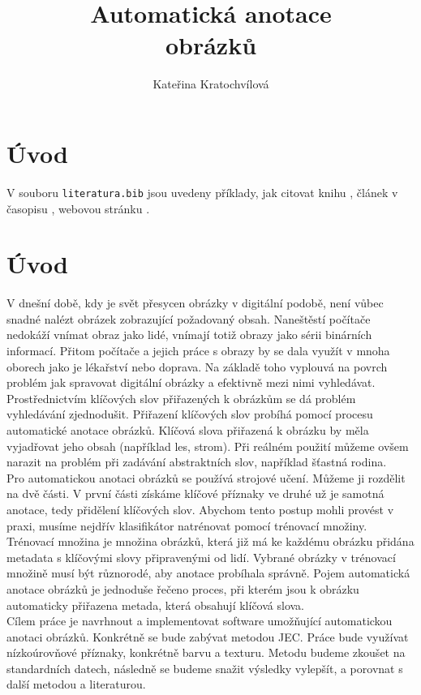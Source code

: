 \documentclass[czech,BP]{thesiskiv}
\author{Kateřina Kratochvílová}
\title{Automatická anotace\\obrázků}
\begin{document}
%
\maketitle
\tableofcontents

\chapter{Úvod}
V souboru \texttt{literatura.bib} jsou uvedeny příklady, jak citovat knihu \cite{KnuthAOCP2}, článek v časopisu \cite{Hoare1961}, webovou stránku \cite{Graphics2D}.


\chapter{Úvod}
V dnešní době, kdy je svět přesycen obrázky v digitální podobě, není vůbec snadné nalézt obrázek zobrazující požadovaný obsah. Naneštěstí počítače nedokáží vnímat obraz jako lidé, vnímají totiž obrazy jako sérii binárních informací. Přitom počítače a jejich práce s obrazy by se dala využít v mnoha oborech jako je lékařství nebo doprava. Na základě toho vyplouvá na povrch problém jak spravovat digitální obrázky a efektivně mezi nimi vyhledávat. Prostřednictvím klíčových slov přiřazených k obrázkům se dá problém vyhledávání zjednodušit. Přiřazení klíčových slov probíhá pomocí procesu automatické anotace obrázků. Klíčová slova přiřazená k obrázku by měla vyjadřovat jeho obsah (například les, strom). Při reálném použití můžeme ovšem narazit na problém při zadávání abstraktních slov, například šťastná rodina.  
\\
Pro automatickou anotaci obrázků se používá strojové učení. Můžeme ji rozdělit na dvě části. V první části získáme klíčové příznaky ve druhé už je samotná anotace, tedy přidělení klíčových slov. Abychom tento postup mohli provést v praxi, musíme nejdřív klasifikátor natrénovat pomocí trénovací množiny. Trénovací množina je množina obrázků, která již má ke každému obrázku přidána metadata s klíčovými slovy připravenými od lidí. Vybrané obrázky v trénovací množině musí být různorodé, aby anotace probíhala správně. Pojem automatická anotace obrázků je jednoduše řečeno proces, při kterém jsou k obrázku automaticky přiřazena metada, která obsahují klíčová slova. 
\\
Cílem práce je navrhnout a implementovat software umožňující automatickou anotaci obrázků. Konkrétně se bude zabývat metodou JEC. Práce bude využívat nízkoúrovňové příznaky, konkrétně barvu a texturu. Metodu budeme zkoušet na standardních datech, následně se budeme snažit výsledky vylepšít, a porovnat s další metodou a literaturou.
\end{document}
